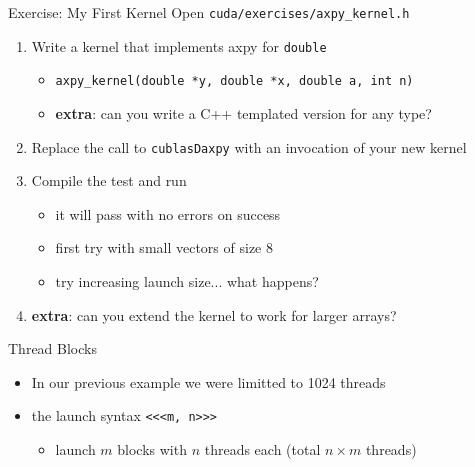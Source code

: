\documentclass[aspectratio=43]{beamer}
\newcommand{\axpy}{{\ttfamily axpy}\xspace}
\newcommand{\extra}{{\bfseries extra}:\xspace}
\newcommand{\lst}[1]{\colorbox{white!90!blue}{\lstinline!#1!}}
\begin{document}
\begin{frame}[fragile]{Exercise: My First Kernel}
    Open \lst{cuda/exercises/axpy_kernel.h}

    \begin{enumerate}
        \item Write a kernel that implements \axpy for \lst{double}
        \begin{itemize}
            \item \lst{axpy_kernel(double *y, double *x, double a, int n)}
            \item \extra can you write a C++ templated version for any type?
        \end{itemize}

        \item Replace the call to \lst{cublasDaxpy} with an invocation of your new kernel
        \item Compile the test and run
        \begin{itemize}
            \item it will pass with no errors on success
            \item first try with small vectors of size 8
            \item try increasing launch size... what happens?
        \end{itemize}
        \item \extra can you extend the kernel to work for larger arrays?
    \end{enumerate}
\end{frame}


\begin{frame}[fragile]{Thread Blocks}
    \begin{info}{}
        \begin{itemize}
            \item In our previous example we were limitted to 1024 threads
            \item the launch syntax \lst{<<<m, n>>>}
            \begin{itemize}
                \item launch $m$ blocks with $n$ threads each (total $n\times m$ threads)
            \end{itemize}
        \end{itemize}
    \end{info}
\end{frame}
\end{document}
